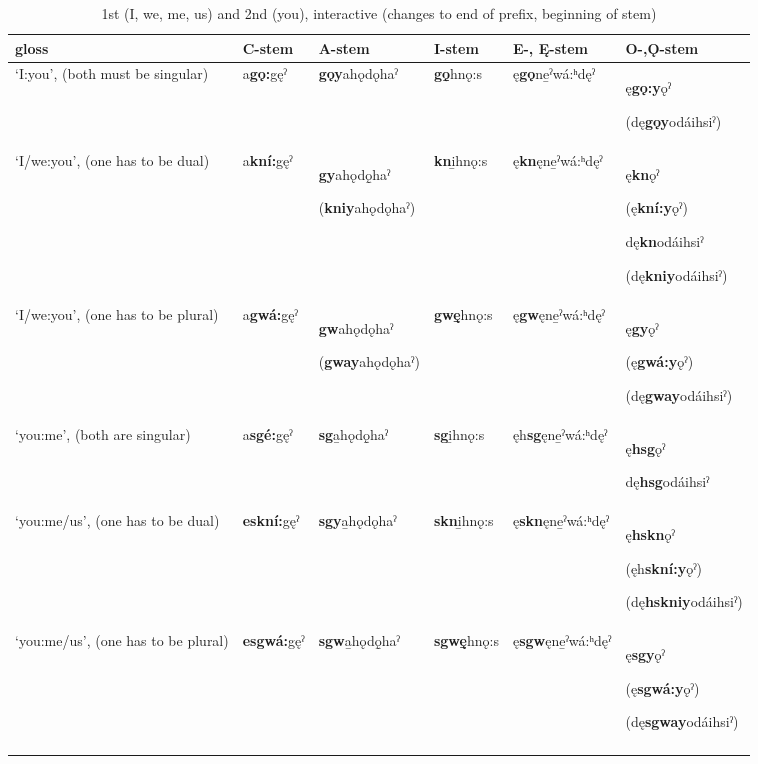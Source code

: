 \begin{table}
\caption{1st (I, we, me, us) and 2nd (you), interactive (changes to end of prefix, beginning of stem)}
\label{tab:1:12pron2}
\tiny{
\begin{tabularx}{\textwidth}{XXXXXX}
\lsptoprule
gloss & C-stem & A-stem & I-stem & E-, Ę{}-stem & O-,Ǫ{}-stem\\
\midrule
‘I:you’, (both must be singular) & a\textbf{gǫ:}gęˀ & \textbf{gǫy}ahǫdǫhaˀ & \textbf{gǫ̱}hnǫ:s & ę\textbf{gǫ}ne̱ˀwá:ʰdęˀ & ę\textbf{gǫ:y}ǫˀ

(dę\textbf{gǫy}odáihsiˀ)\\
‘I/we:you’, (one has to be dual) & a\textbf{kní:}gęˀ & \textbf{gy}ahǫdǫ̱haˀ

(\textbf{kniy}ahǫdǫhaˀ) & \textbf{kn}i̱hnǫ:s & ę\textbf{kn}ęne̱ˀwá:ʰdęˀ & ę\textbf{kn}ǫˀ

(ę\textbf{kní:y}ǫˀ)

dę\textbf{kn}odáihsiˀ

(dę\textbf{kniy}odáihsiˀ)\\
‘I/we:you’, (one has to be plural) & a\textbf{gwá:}gęˀ & \textbf{gw}ahǫdǫhaˀ

(\textbf{gway}ahǫdǫhaˀ) & \textbf{gwę̱}hnǫ:s & ę\textbf{gw}ęne̱ˀwá:ʰdęˀ & ę\textbf{gy}ǫˀ

(ę\textbf{gwá:y}ǫˀ)

(dę\textbf{gway}odáihsiˀ)\\
‘you:me’, (both are singular) & a\textbf{sgé:}gęˀ & \textbf{sg}a̱hǫdǫ̱haˀ & \textbf{sg}i̱hnǫ:s & ęh\textbf{sg}ęne̱ˀwá:ʰdęˀ & ę\textbf{hsg}ǫˀ

dę\textbf{hsg}odáihsiˀ\\
‘you:me/us’, (one has to be dual) & \textbf{eskní:}gęˀ & \textbf{sgy}a̱hǫdǫhaˀ & \textbf{skn}i̱hnǫ:s & ę\textbf{skn}ęne̱ˀwá:ʰdęˀ & ę\textbf{hskn}ǫˀ

(ęh\textbf{skní:y}ǫˀ)

(dę\textbf{hskniy}odáihsiˀ)\\
‘you:me/us’, (one has to be plural) & \textbf{esgwá:}gęˀ & \textbf{sgw}a̱hǫdǫ̱haˀ & \textbf{sgwę̱}hnǫ:s & ę\textbf{sgw}ęne̱ˀwá:ʰdęˀ & ę\textbf{sgy}ǫˀ

(ę\textbf{sgwá:y}ǫˀ)

(dę\textbf{sgway}odáihsiˀ)\\
\lspbottomrule
\end{tabularx}}
\end{table}


\lipsum[1-1]

